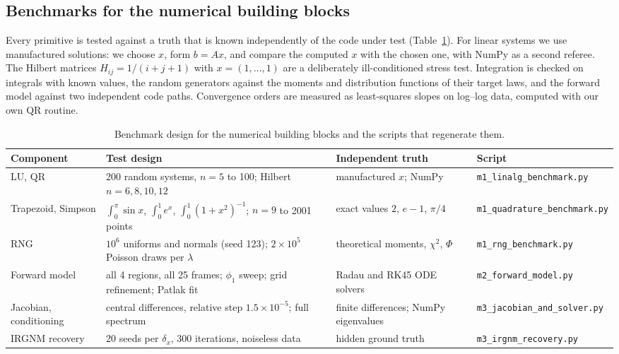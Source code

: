 \documentclass[sigconf,nonacm]{acmart}
\begin{document}
\subsection{Benchmarks for the numerical building blocks}

Every primitive is tested against a truth that is known independently of the code under test (Table~\ref{tab:benchsetup}). For linear systems we use manufactured solutions: we choose $x$, form $b=Ax$, and compare the computed $x$ with the chosen one, with NumPy as a second referee. The Hilbert matrices $H_{ij}=1/(i+j+1)$ with $x=(1,\dots,1)$ are a deliberately ill-conditioned stress test. Integration is checked on integrals with known values, the random generators against the moments and distribution functions of their target laws, and the forward model against two independent code paths. Convergence orders are measured as least-squares slopes on log--log data, computed with our own QR routine.

\begin{table}[t]
\caption{Benchmark design for the numerical building blocks and the scripts that regenerate them.}
\label{tab:benchsetup}
\small
\begin{tabular}{p{}p{}p{}p{}}
\toprule
Component & Test design & Independent truth & Script \\
\midrule
LU, QR & 200 random systems, $n=5$ to 100; Hilbert $n=6,8,10,12$ & manufactured $x$; NumPy & \texttt{m1\_linalg\_benchmark.py} \\
Trapezoid, Simpson & $\int_0^\pi\sin x$, $\int_0^1e^x$, $\int_0^1(1+x^2)^{-1}$; $n=9$ to 2001 points & exact values $2$, $e-1$, $\pi/4$ & \texttt{m1\_quadrature\_benchmark.py} \\
RNG & $10^6$ uniforms and normals (seed 123); $2\times10^5$ Poisson draws per $\lambda$ & theoretical moments, $\chi^2$, $\Phi$ & \texttt{m1\_rng\_benchmark.py} \\
Forward model & all 4 regions, all 25 frames; $\phi_1$ sweep; grid refinement; Patlak fit & Radau and RK45 ODE solvers & \texttt{m2\_forward\_model.py} \\
Jacobian, conditioning & central differences, relative step $1.5\times10^{-5}$; full spectrum & finite differences; NumPy eigenvalues & \texttt{m3\_jacobian\_and\_solver.py} \\
IRGNM recovery & 20 seeds per $\delta_x$, 300 iterations, noiseless data & hidden ground truth & \texttt{m3\_irgnm\_recovery.py} \\
\bottomrule
\end{tabular}
\end{table}
\end{document}
